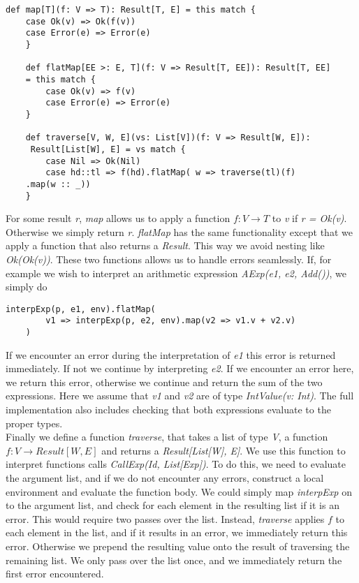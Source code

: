 \begin{lstlisting}[style=simple]
	def map[T](f: V => T): Result[T, E] = this match {
	case Ok(v) => Ok(f(v))
	case Error(e) => Error(e)
	}
	
	def flatMap[EE >: E, T](f: V => Result[T, EE]): Result[T, EE] 
	= this match {
		case Ok(v) => f(v)
		case Error(e) => Error(e)
	}
	
	def traverse[V, W, E](vs: List[V])(f: V => Result[W, E]):
	 Result[List[W], E] = vs match {
		case Nil => Ok(Nil)
		case hd::tl => f(hd).flatMap( w => traverse(tl)(f)
	.map(w :: _))
	}
\end{lstlisting}
For some result \textsl{r}, \textsl{map} allows us to apply a function $f: V \rightarrow T$ to \textsl{v} if \textsl{r = Ok(v)}. Otherwise we simply return \textsl{r}. \textsl{flatMap} has the same functionality except that we apply a function that also returns a \textsl{Result}. This way we avoid nesting like \textsl{Ok(Ok(v))}. These two functions allows us to handle errors seamlessly. If, for example we wish to interpret an arithmetic expression \textsl{AExp(e1, e2, Add())}, we simply do 

\begin{lstlisting}[style=simple]
	interpExp(p, e1, env).flatMap(
		v1 => interpExp(p, e2, env).map(v2 => v1.v + v2.v)
	)
\end{lstlisting}
If we encounter an error during the interpretation of \textsl{e1} this error is returned immediately. If not we continue by interpreting \textsl{e2}. If we encounter an error here, we return this error, otherwise we continue and return the sum of the two expressions. Here we assume that \textsl{v1} and \textsl{v2} are of type \textsl{IntValue(v: Int)}. The full implementation also includes checking that both expressions evaluate to the proper types.
\\
Finally we define a function \textsl{traverse}, that takes a list of type \textsl{V}, a function $f: V \rightarrow Result[W, E]$ and returns a \textsl{Result[List[W], E]}. We use this function to interpret functions calls \textsl{CallExp(Id, List[Exp])}. To do this, we need to evaluate the argument list, and if we do not encounter any errors, construct a local environment and evaluate the function body. We could simply map \textsl{interpExp} on to the argument list, and check for each element in the resulting list if it is an error. This would require two passes over the list. Instead, \textsl{traverse} applies $f$ to each element in the list, and if it results in an error, we immediately return this error. Otherwise we prepend the resulting value onto the result of traversing the remaining list. We only pass over the list once, and we immediately return the first error encountered.
